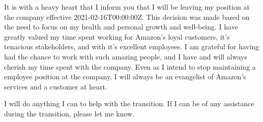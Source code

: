 \documentclass[12pt,stdletter,orderfromtodate,sigleft]{newlfm}
\begin{document}
\begin{newlfm}
It is with a heavy heart that I inform you that I will be leaving my position at the
company effective 2021-02-16T00:00:00Z. This decision was made based on the need to focus
on my health and personal growth and well-being. I have greatly valued my time spent working for
Amazon's loyal customers, it's tenacious stakeholders, and with it's excellent employees.
I am grateful for having had the chance to work with such amazing people, and I have and
will always cherish my time spent with the company. Even as I intend to stop maintaining a
employee position at the company, I will always be an evangelist of Amazon's services and a customer at heart.

I will do anything I can to help with the transition. If I can be of any assistance during
the transition, please let me know.
\end{newlfm}
\end{document}
